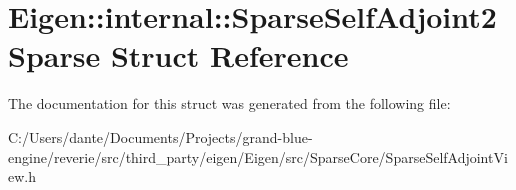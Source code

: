 \hypertarget{struct_eigen_1_1internal_1_1_sparse_self_adjoint2_sparse}{}\section{Eigen\+::internal\+::Sparse\+Self\+Adjoint2\+Sparse Struct Reference}
\label{struct_eigen_1_1internal_1_1_sparse_self_adjoint2_sparse}


The documentation for this struct was generated from the following file\+:\begin{DoxyCompactItemize}
\item 
C\+:/\+Users/dante/\+Documents/\+Projects/grand-\/blue-\/engine/reverie/src/third\+\_\+party/eigen/\+Eigen/src/\+Sparse\+Core/Sparse\+Self\+Adjoint\+View.\+h\end{DoxyCompactItemize}
